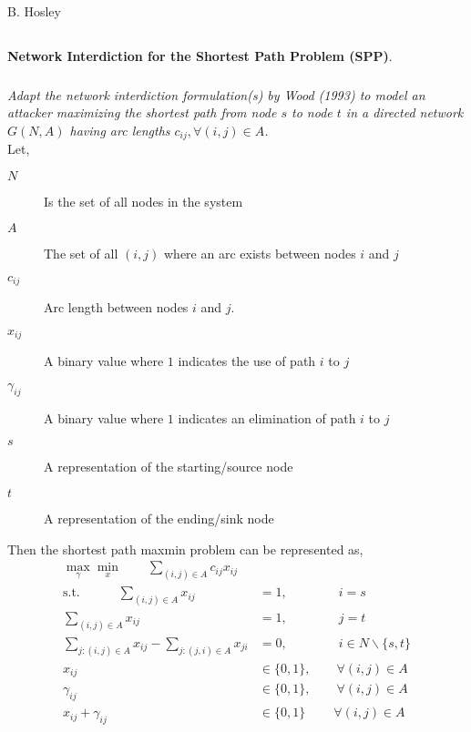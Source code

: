 \documentclass[12pt]{amsart}
\begin{document}
\raggedbottom

\hspace{\fill} {\large B. Hosley}
\bigskip


\setcounter{subsection}{0}
\subsection{}
\textbf{Network Interdiction for the Shortest Path Problem (SPP)}.

\subsubsection{}
\textit{Adapt the network interdiction formulation(s) by Wood (1993) to model an attacker
	maximizing the shortest path from node $s$ to node $t$ in a directed network $G(N, A)$
	having arc lengths $c_{ij}, ∀ (i, j) \in A$.} \\

	Let,
	\begin{description}
		\item[$N$] Is the set of all nodes in the system
		\item[$A$] The set of all $(i,j)$ where an arc exists between nodes $i$ and $j$
		\item[$c_{ij}$] Arc length between nodes $i$ and $j$.
		\item[$x_{ij}$] A binary value where $1$ indicates the use of path $i$ to $j$
		\item[$\gamma_{ij}$] A binary value where $1$ indicates an elimination of path $i$ to $j$
		\item[$s$]  A representation of the starting/source node
		\item[$t$]  A representation of the ending/sink node
	\end{description}

	Then the shortest path maxmin problem can be represented as,
	\begin{align*}
		\max_\gamma\min_x \qquad \sum_{(i,j)\in A} c_{ij}x_{ij}& \\
		\text{s.t.}\qquad\quad
		\sum_{(i,j)\in A}x_{ij} &= 1, \qquad\qquad i=s \\
		\sum_{(i,j)\in A}x_{ij} &= 1, \qquad\qquad j=t \\
		\sum_{j:(i,j)\in A}x_{ij} - \sum_{j:(j,i)\in A}x_{ji} &= 0, \qquad\qquad i\in N\backslash \{s,t\} \\
		x_{ij} &\in \{0,1\}, \qquad \forall(i,j) \in A  \\
		\gamma_{ij} &\in \{0,1\}, \qquad \forall(i,j) \in A \\
		x_{ij} + \gamma_{ij} &\in \{0,1\}\ \qquad \forall(i,j) \in A
	\end{align*}
\end{document}
